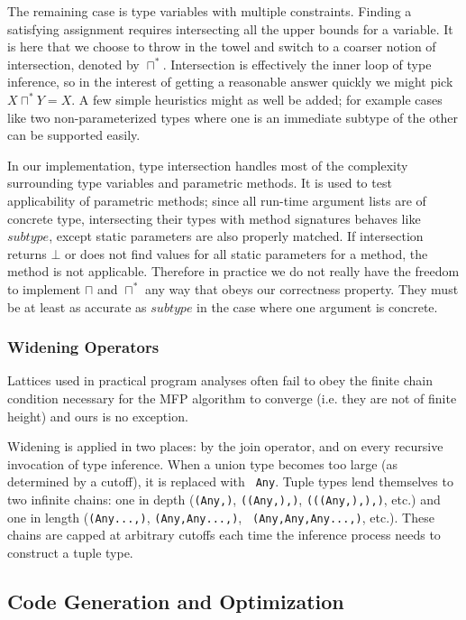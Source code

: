 \documentclass[9pt]{sigplanconf}
\begin{document}
The remaining case is type variables with multiple constraints. Finding
a satisfying assignment requires intersecting all the upper bounds for
a variable. It is here that we choose to throw in the towel and switch
to a coarser notion of intersection, denoted by $\sqcap^{*}$.
Intersection is effectively the inner loop of type inference, so in the
interest of getting a reasonable answer quickly we might pick
$X\sqcap^{*}Y=X$. A few simple heuristics might as well be added; for
example cases like two non-parameterized types where one is an immediate
subtype of the other can be supported easily.

In our implementation, type intersection handles most of the
complexity surrounding type variables and parametric methods.
It is used to test applicability of parametric methods; since all
run-time argument lists are of concrete type, intersecting their types
with method signatures behaves like $subtype$, except static parameters
are also properly matched. If intersection returns $\bot$ or does not find
values for all static parameters for a method, the method is not applicable.
Therefore in practice we do not really have the freedom to implement
$\sqcap$ and $\sqcap^{*}$ any way that obeys our correctness property.
They must be at least as accurate as $subtype$ in the case where one
argument is concrete.


\subsubsection{Widening Operators}

Lattices used in practical program analyses often fail to obey the finite
chain condition necessary for the MFP algorithm to converge (i.e. they
are not of finite height) and ours is no exception.

Widening is applied in two places: by the join operator, and on every
recursive invocation of type inference.  When a union type becomes too
large (as determined by a cutoff), it is replaced with {\tt
  Any}. Tuple types lend themselves to two infinite chains: one in
depth ({\tt (Any,)}, {\tt ((Any,),)}, {\tt (((Any,),),)}, etc.)  and
one in length ({\tt (Any...,)}, {\tt (Any,Any...,)}, {\tt
  (Any,Any,Any...,)}, etc.). These chains are capped at arbitrary
cutoffs each time the inference process needs to construct a tuple
type.



\subsection{Code Generation and Optimization}
\end{document}
